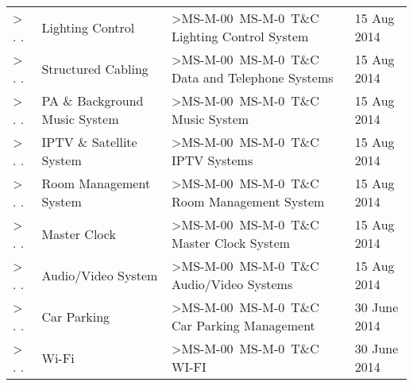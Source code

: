 \documentclass[a4paper, justified]{tufte-book}
\newcounter{tsection}
\newcounter{ms}[tsection]
\newcounter{tsections}[tsection]
\def\inc{\stepcounter{tsections}%
     \ifnum10>\thetsection %
         \thesection.\thetsections\else%
         \thetsection.\thetsections \fi}
\def\service{M}
\def\msinc{\stepcounter{ms}
   \ifnum10>\thems MS-\service-00\thems\  \else MS-\service-0\thems\  \fi }
\def\milestoneviii{30 June 2014}
\def\milestonex{15 Aug 2014}
\begin{document}
{\begin{longtable}{l p{3.5cm}ll}
\inc	&Lighting Control		&\msinc T\&C Lighting Control System &\milestonex \\

\inc	&Structured Cabling		&\msinc T\&C Data and Telephone Systems &\milestonex \\

\inc	&PA \& Background Music System &\msinc T\&C  Music System &\milestonex \\		
\inc	&IPTV \& Satellite System	&\msinc T\&C  IPTV Systems &\milestonex \\	
\inc	&Room Management System	& \msinc T\&C Room Management System &\milestonex \\

\inc  & Master Clock & \msinc T\&C Master Clock System&\milestonex \\
\inc  & Audio/Video System  &\msinc T\&C Audio/Video Systems &\milestonex\\
\inc  &Car Parking&\msinc T\&C Car Parking Management &\milestoneviii\\
\inc  &Wi-Fi&\msinc T\&C WI-FI &\milestoneviii\\
\bottomrule
		
\end{longtable}
\label{mscommissioning}
}
\end{document}
